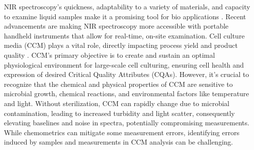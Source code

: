 \documentclass[12pt]{report}
\renewcommand{\cite}{\supercite}
\begin{document}
NIR spectroscopy's quickness, adaptability to a variety of materials, and capacity to examine liquid samples make it a promising tool for bio applications \cite{NearInfraredSpectroscopyBioApplicationsbec2020}. Recent advancements are making NIR spectroscopy more accessible with portable handheld instruments that allow for real-time, on-site examination. 
Cell culture media (CCM) plays a vital role, directly impacting process yield and product quality \cite{CellCultureMediaryder2018}. CCM's primary objective is to create and sustain an optimal physiological environment for large-scale cell culturing, ensuring cell health and expression of desired Critical Quality Attributes (CQAs). However, it's crucial to recognize that the chemical and physical properties of CCM are sensitive to microbial growth, chemical reactions, and environmental factors like temperature and light. Without sterilization, CCM can rapidly change due to microbial contamination, leading to increased turbidity and light scatter, consequently elevating baselines and noise in spectra, potentially compromising measurements. While chemometrics can mitigate some measurement errors, identifying errors induced by samples and measurements in CCM analysis can be challenging.
\end{document}
